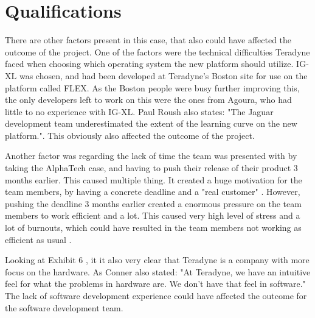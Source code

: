 \section{Qualifications}

There are other factors present in this case, that also could have affected the outcome of the project.
One of the factors were the technical difficulties Teradyne faced when choosing which operating system the new platform should utilize. IG-XL was chosen, and had been developed at Teradyne's Boston site for use on the platform called FLEX. As the Boston people were busy further improving this, the only developers left to work on this were the ones from Agoura, who had little to no experience with IG-XL. Paul Roush also states: "The Jaguar development team underestimated the extent of the learning curve on the new platform."\cite[p. 9]{GinoPisano2005}. This obviously also affected the outcome of the project.

Another factor was regarding the lack of time the team was presented with by taking the AlphaTech case, and having to push their release of their product 3 months earlier. This caused multiple thing. It created a huge motivation for the team members, by having a concrete deadline and a "real customer" \cite[p. 10]{GinoPisano2005}. However, pushing the deadline 3 months earlier created a enormous pressure on the team members to work efficient and a lot. This caused very high level of stress and a lot of burnouts, which could have resulted in the team members not working as efficient as usual \cite[p. 10]{GinoPisano2005}. 

Looking at Exhibit 6 \cite[p. 20]{GinoPisano2005}, it it also very clear that Teradyne is a company with more focus on the hardware. As Conner also stated: "At Teradyne, we have an intuitive feel for what the problems in hardware are. We don't have that feel in software."\cite[p. 10]{GinoPisano2005} The lack of software development experience could have affected the outcome for the software development team. 